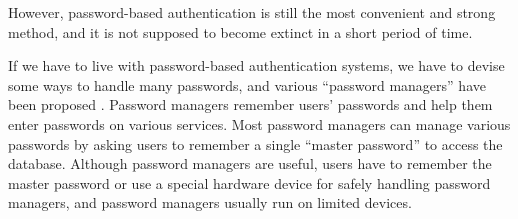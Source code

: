 \documentclass[runningheads,a4paper]{llncs}
\begin{document}
However,
password-based authentication is still the most
convenient and strong method\cite{Bonnearu:ReplacePasswords},
and it is not supposed to become extinct
in a short period of time\cite{Herley:2009:PSS:1601990.1602010}.



If we have to live with password-based authentication systems,
we have to devise some ways to handle many passwords, and
various ``password managers'' have been proposed
\cite{OnePassword}%
\cite{Dashlane}%
\cite{ミルパス}%
\cite{LastPass}%
\cite{KeyPass}%
\cite{NortonIDSafe}%
\cite{IDManager}.
%
Password managers remember users' passwords and help them enter
passwords on various services.
%
%
Most password managers can manage various passwords by
asking users to remember a single ``master password'' to access the database.
%
%
Although password managers are useful,
users have to remember the master password
or use a special hardware device
for safely handling password managers, and
password managers usually run on limited devices.

%
\end{document}

